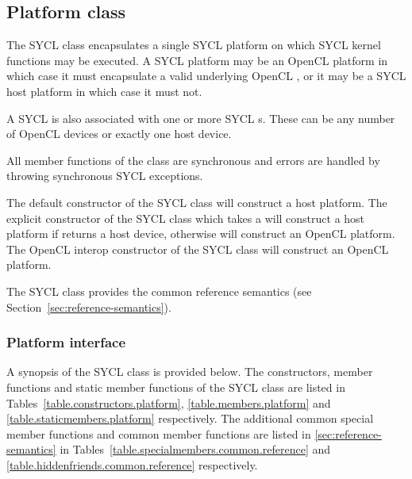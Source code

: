 \completeTable

\subsection{Platform class}

\label{sec:platform-class}

The SYCL  class encapsulates a single SYCL platform on which SYCL kernel functions may be executed. A SYCL platform may be an OpenCL platform in which case it must encapsulate a valid underlying OpenCL , or it may be a SYCL host platform in which case it must not.

A SYCL  is also associated with one or more SYCL s. These can be any number of OpenCL devices or exactly one host device.

All member functions of the  class are synchronous and errors are handled by throwing synchronous SYCL exceptions.

The default constructor of the SYCL  class will construct
a host platform. The explicit constructor of the SYCL 
class which takes a  will construct a host platform
if  returns a host device, otherwise will construct
an OpenCL platform. The OpenCL interop constructor of the SYCL
 class will construct an OpenCL platform.

The SYCL  class provides the common reference semantics
(see Section~\ref{sec:reference-semantics}).

\subsubsection{Platform interface}

A synopsis of the SYCL  class is provided below. The constructors, member functions and static member functions of the SYCL  class are listed in Tables~\ref{table.constructors.platform}, \ref{table.members.platform} and \ref{table.staticmembers.platform} respectively. The additional common special member functions and common member functions are listed in \ref{sec:reference-semantics} in Tables~\ref{table.specialmembers.common.reference} and \ref{table.hiddenfriends.common.reference} respectively.

